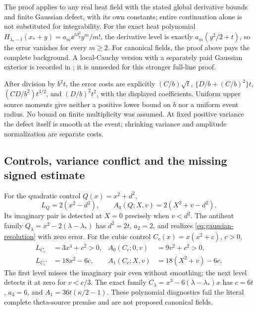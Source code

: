The proof applies to any real heat field with the stated global
derivative bounds and finite Gaussian defect, with its own constants;
entire continuation alone is not substituted for integrability.
For the exact heat polynomial
\(H_{\lambda_*-t}(x_*+y)=a_m\ee^{t\partial_y^2}y^m/m!\),
the derivative level is exactly \(a_m(y^2/2+t)\), so the error vanishes
for every \(m\ge2\). For canonical fields, the proof above pays the
complete background. A local-Cauchy version with a separately paid
Gaussian exterior is recorded in \cite{GaussianLaguerreProof}; it is
unneeded for this stronger full-line proof.

After division by \(b^2t\), the error costs are explicitly
\((C/b)\sqrt t\), \(\{D/b+(C/b)^2\}t\),
\((CD/b^2)t^{3/2}\), and \((D/b)^2t^2\), with the displayed
coefficients. Uniform upper source moments give neither a positive
lower bound on \(b\) nor a uniform event radius. No bound on finite
multiplicity was assumed. At fixed positive variance the defect itself
is smooth at the event; shrinking variance and amplitude normalization
are separate costs.

\subsection{Controls, variance conflict and the missing signed estimate}
For the quadratic control \(Q(x)=x^2+d^2\),
\[
 L_Q=2(x^2-d^2),\qquad A_0(Q;X,v)=2(X^2+v-d^2).
\]
Its imaginary pair is detected at \(X=0\) precisely when \(v<d^2\).
The antiheat family \(Q_\lambda=x^2-2(\lambda-\lambda_*)\)
has \(d^2=2t\), \(a_2=2\), and realizes
\eqref{eq:gaussian-resolution} with zero error. For the cubic control
\(C_c(x)=x(x^2+c)\), \(c>0\),
\begin{align*}
 L_{C_c}&=3x^4+c^2>0,& A_0(C_c;0,v)&=9v^2+c^2>0,\\
 L_{C_c'}&=18x^2-6c,& A_1(C_c;X,v)&=18(X^2+v)-6c.
\end{align*}
The first level misses the imaginary pair even without smoothing;
the next level detects it at zero for \(v<c/3\).
The exact family \(C_\lambda=x^3-6(\lambda-\lambda_*)x\) has
\(c=6t\), \(a_3=6\), and \(A_1=36t(\kappa/2-1)\).
These polynomial diagnostics fail the literal complete theta-source
premise and are not proposed canonical fields.

